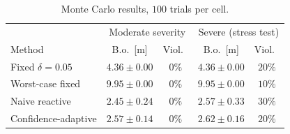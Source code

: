\begin{table}[t]
\centering
\caption{Monte Carlo results, $100$ trials per cell.}
\label{tab:montecarlo}
\small
\begin{tabular}{lcccc}
\toprule
 & \multicolumn{2}{c}{Moderate severity} & \multicolumn{2}{c}{Severe (stress test)} \\
Method & B.o.\ [m] & Viol.\ & B.o.\ [m] & Viol.\ \\
\midrule
Fixed $\delta=0.05$ & $4.36\pm0.00$ & $0\%$ & $4.36\pm0.00$ & $20\%$ \\
Worst-case fixed & $9.95\pm0.00$ & $0\%$ & $9.95\pm0.00$ & $10\%$ \\
Naive reactive & $2.45\pm0.24$ & $0\%$ & $2.57\pm0.33$ & $30\%$ \\
Confidence-adaptive & $2.57\pm0.14$ & $0\%$ & $2.62\pm0.16$ & $20\%$ \\
\bottomrule
\end{tabular}
\end{table}